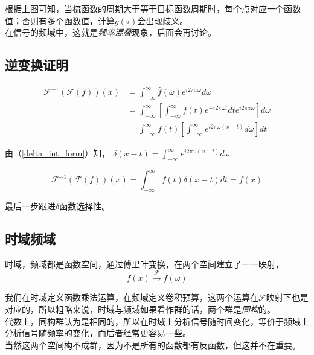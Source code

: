 		根据上图可知，当梳函数的周期大于等于目标函数周期时，每个点对应一个函数值；否则有多个函数值，计算$g(\tau)$会出现歧义。\\

		在信号的频域中，这就是\textit{频率混叠}现象，后面会再讨论。

\subsection{逆变换证明}
	\begin{align*}
		\mathcal{F}^{-1}(\mathcal{F}(f))(x) &= \int_{-\infty}^{\infty} \hat{f}(\omega) e^{i2\pi x\omega}d\omega\\
			 &= \int_{-\infty}^{\infty} 
			 \left[
			 \int_{-\infty}^{\infty}f(t)e^{-i2\pi \omega t}dt e^{i2\pi x\omega}\right]d\omega\\
			 &= \int_{-\infty}^{\infty} f(t)
			 	\left[
			 		\int_{-\infty}^{\infty}e^{i2\pi \omega (x-t)}d\omega
			 	\right]dt
	\end{align*}

	由（\ref{delta_int_form}）知，
	$
		\delta(x-t) = \int_{-\infty}^{\infty}e^{i2\pi \omega (x-t)}d\omega
	$

	$$
		\mathcal{F}^{-1}(\mathcal{F}(f))(x) = \int_{-\infty}^{\infty} f(t) \delta(x-t)dt = f(x)
	$$

	最后一步跟进$\delta$函数选择性。

\subsection{时域频域}

	时域，频域都是函数空间，通过傅里叶变换，在两个空间建立了一一映射，
	$$
		f(x) \overset{\mathcal{F}}{\rightarrow} \hat{f}(\omega) 
	$$

	我们在时域定义函数乘法运算，在频域定义卷积预算，这两个运算在$\mathcal{F}$映射下也是对应的，所以粗略来说，时域与频域如果看作群的话，两个群是\textit{同构}的。\\

	代数上，同构群认为是相同的，所以在时域上分析信号随时间变化，等价于频域上分析信号随频率的变化，而后者经常更容易一些。\\

	当然这两个空间构不成群，因为不是所有的函数都有反函数，但这并不在重要。
